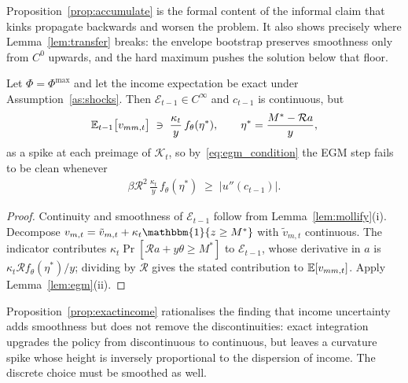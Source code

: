 Proposition~\ref{prop:accumulate} is the formal content of the informal claim that
kinks propagate backwards and worsen the problem. It also shows precisely where
Lemma~\ref{lem:transfer} breaks: the envelope bootstrap preserves smoothness only from
$C^{0}$ upwards, and the hard maximum pushes the solution below that floor.

\begin{proposition}
\label{prop:exactincome}
Let $\Phi=\Phi^{\max}$ and let the income expectation be exact under
Assumption~\ref{as:shocks}. Then $\mathcal{E}_{t-1}\in C^{\infty}$ and $c_{t-1}$ is
continuous, but
\begin{align}
\mathbb{E}_{t-1}\big[v_{mm,t}\big] \;\ni\; \frac{\kappa_t}{y}\,f_\theta(\eta^{\ast}),
\qquad \eta^{\ast}=\frac{M^{\ast}-\mathcal{R}a}{y},
\end{align}
as a spike at each preimage of $\mathcal{K}_t$, so by~\eqref{eq:egm_condition} the EGM
step fails to be clean whenever
\begin{align}
\beta\mathcal{R}^{2}\,\frac{\kappa_t}{y}\,f_\theta(\eta^{\ast})
\;\ge\; \big|u''(c_{t-1})\big| .
\label{eq:income_threshold}
\end{align}
\end{proposition}

\begin{proof}
Continuity and smoothness of $\mathcal{E}_{t-1}$ follow from
Lemma~\ref{lem:mollify}(i). Decompose $v_{m,t}=\tilde v_{m,t}+\kappa_t\mathbbm{1}\{z\ge M^{\ast}\}$
with $\tilde v_{m,t}$ continuous. The indicator contributes
$\kappa_t\Pr[\mathcal{R}a+y\theta\ge M^{\ast}]$ to $\mathcal{E}_{t-1}$, whose derivative in
$a$ is $\kappa_t\mathcal{R}f_\theta(\eta^{\ast})/y$; dividing by $\mathcal{R}$ gives the
stated contribution to $\mathbb{E}[v_{mm,t}]$. Apply Lemma~\ref{lem:egm}(ii).
\end{proof}

Proposition~\ref{prop:exactincome} rationalises the finding that income uncertainty adds smoothness but does not
remove the discontinuities: exact integration upgrades the policy from discontinuous to
continuous, but leaves a curvature spike whose height is inversely proportional to the
dispersion of income. The discrete choice must be smoothed as well.

